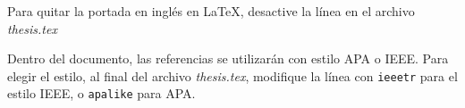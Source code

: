Para quitar la portada en inglés en \LaTeX, desactive la línea \verb!! en el archivo \textit{thesis.tex}

Dentro del documento, las referencias se utilizarán con estilo APA o IEEE. Para elegir el estilo, al final del archivo \textit{thesis.tex}, modifique la línea \verb!! con \verb!ieeetr! para el estilo IEEE, o \verb!apalike! para APA.